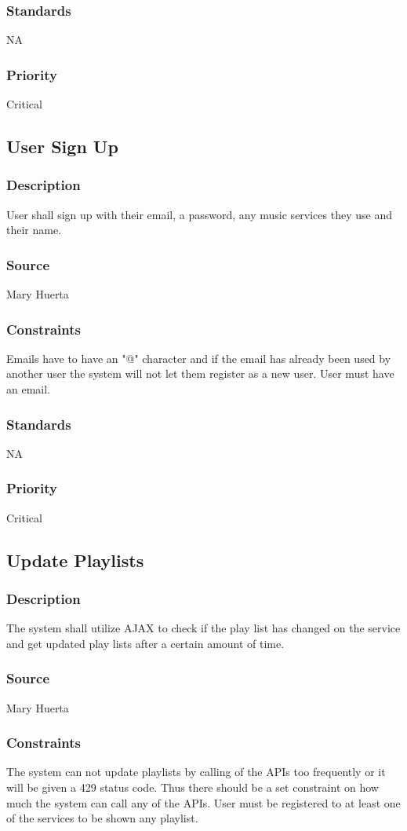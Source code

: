 \subsubsection{Standards}
NA
\subsubsection{Priority}
Critical


\subsection{User Sign Up}
\subsubsection{Description}
User shall sign up with their email, a password, any music services they use and their name.
\subsubsection{Source}
Mary Huerta
\subsubsection{Constraints}
Emails have to have an "@" character and if the email has already been used by another user the system will not let them register as a new user. User must have an email.
\subsubsection{Standards}
NA
\subsubsection{Priority}
Critical


\subsection{Update Playlists}
\subsubsection{Description}
The system shall utilize AJAX to check if the play list has changed on the service and get updated play lists after a certain amount of time.
\subsubsection{Source}
Mary Huerta
\subsubsection{Constraints}
The system can not update playlists by calling of the APIs too frequently or it will be given a 429 status code. Thus there should be a set constraint on how much the system can call any of the APIs. User must be registered to at least one of the services to be shown any playlist.
